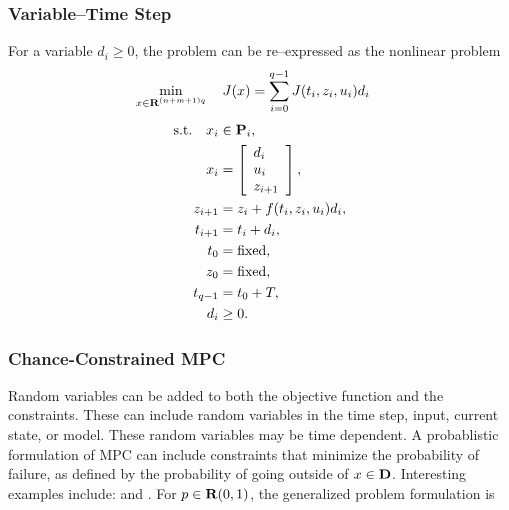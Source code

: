 \documentclass{article}
\begin{document}
\subsubsection{Variable--Time Step}

    For a variable $d_i\geq0$, the problem can be re--expressed as the nonlinear problem
    \begin{align*}
        \min_{x\in\textbf{R}^{(n+m+1)q}}\quad J(x)&=\sum_{i=0}^{q-1}  J (t_i,z_i,u_i) d_i
    \end{align*}
    \begin{align*}
        \text{s.t.}\quad x_i&\in\textbf{P}_i,\\
        x_i&=\left[\begin{array}{lllllllllllllllllll}d_i\\u_i\\z_{i+1}\end{array}\right],\\
        z_{i+1} &= z_i+f(t_i,z_i,u_i)d_i,\\
        t_{i+1} &=t_i + d_i,\\
        t_{0}&=\text{fixed},\\
        z_{0}&=\text{fixed},\\
        t_{q-1}&=t_0+T,\\
        d_i&\geq 0.
    \end{align*}


    \clearpage

\subsubsection{Chance-Constrained MPC}

    Random variables can be added to both the objective function and the constraints.  
    These can include random variables in the time step, input, current state, or model.  These random variables may be time dependent. 
    A probablistic formulation of MPC can include 
    constraints that minimize the probability of failure, 
    as defined by the probability of going outside of $x\in\textbf{D}$.
    Interesting examples include: \cite{chance} and  \cite{chance2}.
    For $p\in\textbf{R}(0,1)$, the generalized problem formulation is
\end{document}
